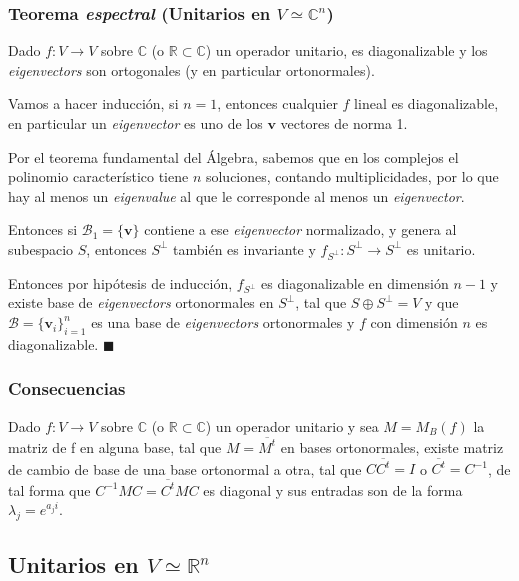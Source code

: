 \documentclass{preset}
\newcommand{\compconj}[1]{%
  \overline{#1}%
}
\begin{document}
\vspace{-15pt}
\subsubsection{Teorema \textit{espectral} (Unitarios en $V\simeq \mathbb{C}^n$)}

Dado $f: V \rightarrow V$ sobre $\mathbb{C}$ (o $\mathbb{R} \subset \mathbb{C}$) un operador unitario, es diagonalizable y los \textit{eigenvectors} son ortogonales (y en particular ortonormales).

Vamos a hacer inducción, si $n = 1$, entonces cualquier $f$ lineal es diagonalizable, en particular un \textit{eigenvector} es uno de los $\textbf{v}$ vectores de norma 1.

Por el teorema fundamental del Álgebra, sabemos que en los complejos el polinomio característico tiene $n$ soluciones, contando multiplicidades, por lo que hay al menos un \textit{eigenvalue} al que le corresponde al menos un \textit{eigenvector}.

Entonces si $\mathcal{B}_1=\{\textbf{v}\}$ contiene a ese \textit{eigenvector} normalizado, y genera al subespacio $S$, entonces $S^\perp$ también es invariante y $f_{S^\perp}: S^\perp \rightarrow S^\perp$ es unitario.

Entonces por hipótesis de inducción, $f_{S^\perp}$ es diagonalizable en dimensión $n-1$ y existe base de \textit{eigenvectors} ortonormales en $S^\perp$, tal que $S \oplus S^\perp = V$ y que $\mathcal{B}=\{\textbf{v}_i\}_{i=1}^n$ es una base de \textit{eigenvectors} ortonormales y $f$ con dimensión $n$ es diagonalizable.  $\blacksquare$

\subsubsection{Consecuencias}
\vspace{-10pt}

Dado $f: V \rightarrow V$ sobre $\mathbb{C}$ (o $\mathbb{R} \subset \mathbb{C}$) un operador unitario y sea $M=M_B(f)$ la matriz de f en alguna base, tal que $M=\compconj{M^t}$ en bases ortonormales, existe matriz de cambio de base de una base ortonormal a otra, tal que $C\compconj{C^t}=I$ o $\compconj{C^t}=C^{-1}$, de tal forma que $C^{-1}MC=\compconj{C^t}MC$ es diagonal y sus entradas son de la forma $\lambda_j=e^{a_j i}$.

\vspace{-15pt}
\subsection{Unitarios en $V\simeq \mathbb{R}^n$}
\end{document}

